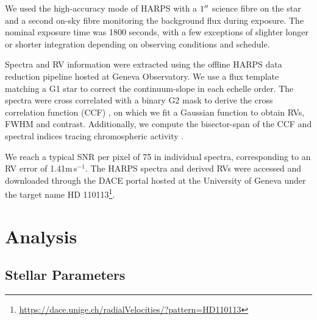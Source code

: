 \documentclass[fleqn,usenatbib]{mnras}
\newcommand{\ms}{m\,s$^{-1}$}
\begin{document}
We used the high-accuracy mode of HARPS with a $1\hbox{$^{\prime\prime}$}$ science fibre on the star and a second on-sky fibre monitoring the background flux during exposure. %
The nominal exposure time was 1800 seconds, with a few exceptions of slighter longer or shorter integration depending on observing conditions and schedule.

Spectra and RV information were extracted using the 
offline HARPS data reduction pipeline hosted at Geneva Observatory. 
We use a flux template matching a G1 star to correct the continuum-slope in each echelle order. 
The spectra were cross correlated with a binary G2 mask to derive the cross correlation function (CCF) \citep{1996A&AS..119..373B}, on which we fit a Gaussian function to obtain RVs, FWHM and contrast. 
Additionally, we compute the bisector-span \citep{2001A&A...379..279Q} of the CCF and spectral indices tracing chromospheric activity \citep{2011A&A...534A..30G,2009A&A...495..959B}.

We reach a typical SNR per pixel of 75 in individual spectra, corresponding to an RV error of 1.41\ms{}.
The HARPS spectra and derived RVs were accessed and downloaded through the DACE portal hosted at the University of Geneva \citep{2015ASPC..495....7B} under the target name HD 110113\footnote{\url{https://dace.unige.ch/radialVelocities/?pattern=HD110113}}.

\section{Analysis}\label{sect:analysis}
\subsection{Stellar Parameters}
\end{document}
